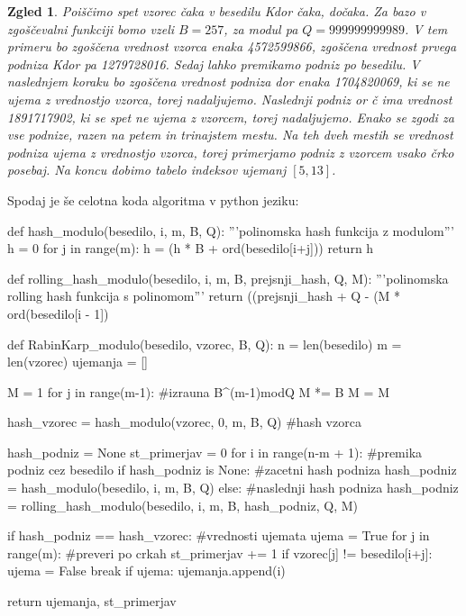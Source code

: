 \documentclass[12pt]{article}
\newtheorem{Zgled}[Izrek]{{\sc Zgled}}
\newenvironment{zgled}{\begin{Zgled}\rm}{\end{Zgled}}
\begin{document}
\begin{zgled}
  Poiščimo spet vzorec \textit{čaka} v besedilu \textit{Kdor čaka, dočaka.}
  Za bazo v zgoščevalni funkciji bomo vzeli $B = 257$, za modul pa $Q = 999999999989$. V tem primeru bo zgoščena vrednost vzorca enaka 4572599866,
  zgoščena vrednost prvega podniza \textit{Kdor} pa 1279728016. Sedaj lahko premikamo podniz po besedilu. V naslednjem koraku bo zgoščena vrednost
  podniza \textit{dor } enaka 1704820069, ki se ne ujema z vrednostjo vzorca, torej nadaljujemo. Naslednji podniz \textit{or č} ima vrednost 1891717902,
  ki se spet ne ujema z vzorcem, torej nadaljujemo. Enako se zgodi za vse podnize, razen na petem in trinajstem mestu. Na teh dveh mestih se vrednost podniza
  ujema z vrednostjo vzorca, torej primerjamo podniz z vzorcem vsako črko posebaj. Na koncu dobimo tabelo indeksov ujemanj $[5, 13]$.
\end{zgled}

Spodaj je še celotna koda algoritma v python jeziku:
\begin{python}
  def hash_modulo(besedilo, i, m, B, Q):
    '''polinomska hash funkcija z modulom'''
    h = 0
    for j in range(m):
        h = (h * B + ord(besedilo[i+j])) %
    return h

def rolling_hash_modulo(besedilo, i, m, B, prejsnji_hash, Q, M):
    '''polinomska rolling hash funkcija s polinomom'''
    return ((prejsnji_hash + Q - (M * ord(besedilo[i - 1]) %

def RabinKarp_modulo(besedilo, vzorec, B, Q):
    n = len(besedilo)
    m = len(vzorec)
    ujemanja = []
    
    M = 1
    for j in range(m-1): #izrauna B^(m-1)modQ
        M *= B
        M = M %
    
    hash_vzorec = hash_modulo(vzorec, 0, m, B, Q) #hash vzorca
    
    hash_podniz = None
    st_primerjav = 0
    for i in range(n-m + 1): #premika podniz cez besedilo
        if hash_podniz is None: #zacetni hash podniza
            hash_podniz = hash_modulo(besedilo, i, m, B, Q)
        else: #naslednji hash podniza
            hash_podniz = rolling_hash_modulo(besedilo, i, m, B, hash_podniz, Q, M)
        
        if hash_podniz == hash_vzorec: #vrednosti ujemata
            ujema = True
            for j in range(m): #preveri po crkah
                st_primerjav += 1
                if vzorec[j] != besedilo[i+j]:
                    ujema = False
                    break
            if ujema:
                ujemanja.append(i)
    
    return ujemanja, st_primerjav
\end{python}
\end{document}
